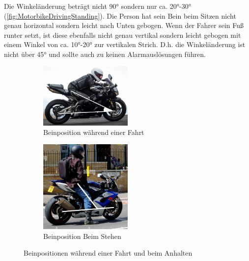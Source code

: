 Die Winkeländerung beträgt nicht \ang{90} sondern nur ca. \ang{20}-\ang{30} (\autoref{fig:MotorbikeDrivingStanding}). Die Person hat sein Bein beim Sitzen nicht genau horizontal sondern leicht nach Unten gebogen. Wenn der Fahrer sein Fuß runter setzt, ist diese ebenfalls nicht genau vertikal sondern leicht gebogen mit einem Winkel von ca. \ang{10}-\ang{20} zur vertikalen Strich. D.h. die Winkeländerung ist nicht über \ang{45} und sollte auch zu keinen Alarmauslösungen führen.

\begin{figure} %
	\centering
	\begin{subfigure}{\textwidth}
		\centering
		\includegraphics[width=0.5\textwidth]{Bilder/MotorbikeDriving2.png}
		\caption{Beinposition während einer Fahrt}
		\label{fig:MotorbikeDriving}
	\end{subfigure}
	\hfill
	\begin{subfigure}{\textwidth}
		\centering
		\includegraphics[width=0.5\textwidth]{Bilder/MotorbikeStanding2.png}
		\caption{Beinposition Beim Stehen}
		\label{fig:MotorbikeStanding2}
	\end{subfigure}
	\caption{Beinpositionen während einer Fahrt und beim Anhalten}
	\label{fig:MotorbikeDrivingStanding}
\end{figure}




 